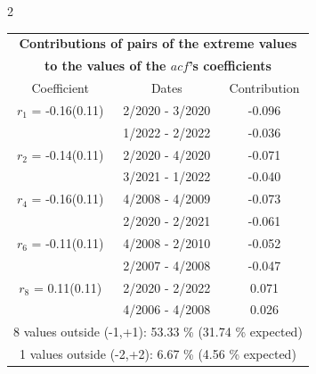 
\thispagestyle{empty}
\begin{multicols}{2}{ 
\begin{tabular}{ccc}
\multicolumn{3}{c}{\textbf{Contributions of pairs of the extreme values} }  \vspace{-.10in}  \\ 
\multicolumn{3}{c}{ \textbf{to the values of the $acf$'s coefficients}} \\ 
\hline 
\hline                  Coefficient  &  Dates &  Contribution \\ 
\hline 
  $r_{ 1}$ = -0.16(0.11) &       2/2020 -  3/2020 &       -0.096    \vspace{-.10in} \\ 
  &        1/2022 -  2/2022 &       -0.036  \vspace{-.02in}   \\ \hline 
    $r_{ 2}$ = -0.14(0.11) &       2/2020 -  4/2020 &       -0.071    \vspace{-.10in} \\ 
  &        3/2021 -  1/2022 &       -0.040  \vspace{-.02in}   \\ \hline 
    $r_{ 4}$ = -0.16(0.11) &       4/2008 -  4/2009 &       -0.073    \vspace{-.10in} \\ 
  &        2/2020 -  2/2021 &       -0.061  \vspace{-.02in}   \\ \hline 
    $r_{ 6}$ = -0.11(0.11) &       4/2008 -  2/2010 &       -0.052    \vspace{-.10in} \\ 
  &        2/2007 -  4/2008 &       -0.047  \vspace{-.02in}   \\ \hline 
    $r_{ 8}$ = 0.11(0.11) &       2/2020 -  2/2022 &        0.071   \vspace{-.10in} \\  
&        4/2006 -  4/2008 &        0.026  \vspace{-.02in} \\ \hline 
\multicolumn{3}{c}{               8 values outside (-1,+1): 53.33  \% (31.74  \% expected)}\vspace{-.10in} \\ 
\multicolumn{3}{c}{               1 values outside (-2,+2):  6.67 \%  (4.56 \% expected) } \\
 \end{tabular} \\ 
 } 
\end{multicols} 

